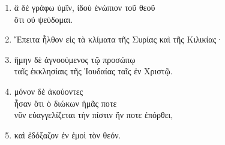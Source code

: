 \documentclass[12pt,a4paper,titlepage]{article}
\newlength{\indentunit}
\newlength{\curindent}
\newcommand{\indentlvl}[1]{\setlength{\curindent}{#1\indentunit}\hspace*{\curindent}}
\newcommand{\brk}{\\
\hspace*{\curindent}} %
\def \pscolor{red} %
\def \pslabelsep{0.3em} %
\def \psleftmargin{1.5em} %
\begin{document}
\begin{enumerate}[leftmargin=\psleftmargin, labelsep=\pslabelsep, label=\arabic*, align=right, font=\fontspec{Linux Libertine}\color{\pscolor}\small\textsuperscript, parsep=0em, itemsep=0em, topsep=0em]
  \item ἃ δὲ γράφω ὑμῖν, ἰδοὺ ἐνώπιον τοῦ θεοῦ\\
        \indentlvl{1}ὅτι οὐ ψεύδομαι.
  \item Ἔπειτα ἦλθον εἰς τὰ κλίματα τῆς Συρίας καὶ τῆς Κιλικίας·
  \item ἤμην δὲ ἀγνοούμενος τῷ προσώπῳ\\
        \indentlvl{1}ταῖς ἐκκλησίαις τῆς Ἰουδαίας ταῖς ἐν Χριστῷ.
  \item μόνον δὲ ἀκούοντες\\
        \indentlvl{1}ἦσαν ὅτι ὁ διώκων ἡμᾶς ποτε\brk
        νῦν εὐαγγελίζεται τὴν πίστιν ἥν ποτε ἐπόρθει,
  \item καὶ ἐδόξαζον ἐν ἐμοὶ τὸν θεόν.
\end{enumerate}
\end{document}

